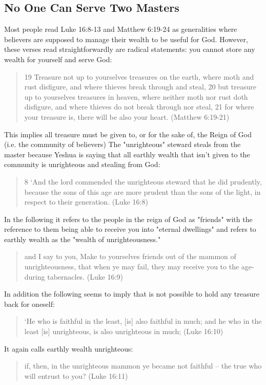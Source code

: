 \documentclass[11pt]{article}
\begin{document}
\subsection{No One Can Serve Two Masters}
Most people read Luke 16:8-13 and Matthew 6:19-24 as generalities where believers are supposed to manage their wealth to be useful for God. However, these verses read straightforwardly are radical statements: you cannot store any wealth for yourself and serve God:
\begin{quote} 19 Treasure not up to yourselves treasures on the earth, where moth and rust disfigure, and where thieves break through and steal, 20 but treasure up to yourselves treasures in heaven, where neither moth nor rust doth disfigure, and where thieves do not break through nor steal, 21 for where your treasure is, there will be also your heart. (Matthew 6:19-21)
\end{quote}
This implies all treasure must be given to, or for the sake of, the Reign of God (i.e. the community of believers) 
The "unrighteous" steward steals from the master because Yeshua is saying that all earthly wealth that isn't given to the community is unrighteous and stealing from God:  
\begin{quote}
8 ‘And the lord commended the unrighteous steward that he did prudently, because the sons of this age are more prudent than the sons of the light, in respect to their generation. (Luke 16:8)
\end{quote}
In the following it refers to the people in the reign of God as "friends" with the reference to them being able to receive you into "eternal dwellings" and refers to earthly wealth as the "wealth of unrighteousness."
\begin{quote}
and I say to you, Make to yourselves friends out of the mammon of unrighteousness, that when ye may fail, they may receive you to the age-during tabernacles. (Luke 16:9) \end{quote}
In addition the following seems to imply that is not possible to hold any treasure back for oneself: 
\begin{quote}
`He who is faithful in the least, [is] also faithful in much; and he who in the least [is] unrighteous, is also unrighteous in much; (Luke 16:10)
\end{quote}
It again calls earthly wealth unrighteous: 
\begin{quote}
if, then, in the unrighteous mammon ye became not faithful -- the true who will entrust to you? (Luke 16:11) 
\end{quote}
\end{document}
